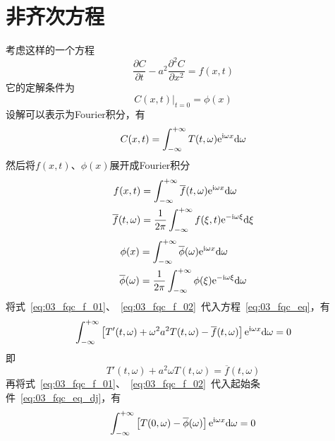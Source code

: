 \section{非齐次方程}
考虑这样的一个方程
\begin{equation}\label{eq:03_fqc_eq}
 \dfrac{\partial C}{\partial t}-a^2\dfrac{\partial^2 C}{\partial x^2}=f(x,t)
\end{equation}
它的定解条件为
\begin{equation}\label{eq:03_fqc_eq_dj}
 \left.C(x,t)\right|_{t=0}=\phi(x)
\end{equation}
设解可以表示为Fourier积分，有
\begin{equation}\label{eq:03_fqc_jie_f}
 C(x,t)=\int_{-\infty}^{+\infty}T(t,\omega)\mathrm{e}^{\mathrm{i}\omega x}\mathrm{d}\omega
\end{equation}
然后将$f(x,t)$、$\phi(x)$展开成Fourier积分
\begin{equation}\label{eq:03_fqc_f_01}
 \begin{split}
  f(x,t)&=\int_{-\infty}^{+\infty}\overline{f}(t,\omega)\mathrm{e}^{\mathrm{i}\omega x}\mathrm{d}\omega\\
  \overline{f}(t,\omega)&=\dfrac{1}{2\pi}\int_{-\infty}^{+\infty}f(\xi,t)\mathrm{e}^{-\mathrm{i}\omega\xi}\mathrm{d}\xi
 \end{split}
\end{equation}
\begin{equation}\label{eq:03_fqc_f_02}
 \begin{split}
  \phi(x)&=\int_{-\infty}^{+\infty}\overline{\phi}(\omega)\mathrm{e}^{\mathrm{i}\omega x}\mathrm{d}\omega\\
  \overline{\phi}(\omega)&=\dfrac{1}{2\pi}\int_{-\infty}^{+\infty}\phi(\xi)\mathrm{e}^{-\mathrm{i}\omega\xi}\mathrm{d}\omega
 \end{split}
\end{equation}
将式~\eqref{eq:03_fqc_f_01}、~\eqref{eq:03_fqc_f_02}~代入方程~\eqref{eq:03_fqc_eq}，有
\begin{equation*}
 \int_{-\infty}^{+\infty}\left[T'(t,\omega)+\omega^2 a^2T(t,\omega)-\overline{f}(t,\omega)\right]\mathrm{e}^{\mathrm{i}\omega x}\mathrm{d}\omega=0
\end{equation*}
即
\begin{equation}\label{eq:03_fqc_f_re}
 T'(t,\omega)+a^2\omega T(t,\omega)=\overline{f}(t,\omega)
\end{equation}
再将式~\eqref{eq:03_fqc_f_01}、~\eqref{eq:03_fqc_f_02}~代入起始条件~\eqref{eq:03_fqc_eq_dj}，有
\begin{equation*}
 \int_{-\infty}^{+\infty}\left[T(0,\omega)-\overline{\phi}(\omega)\right]\mathrm{e}^{\mathrm{i}\omega x}\mathrm{d}\omega=0
\end{equation*}
